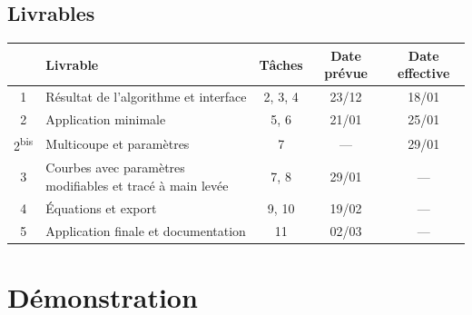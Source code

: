 \documentclass[xcolor=dvipsnames]{beamer}
\begin{document}
	\subsection{Livrables}
	\begin{frame}{\subsecname}
		\begin{center}
		\small
		\begin{tabular}{|c|>{\raggedright}m{3cm}|c|c|c|} %
			\hline
			\textbf{\No} & \textbf{Livrable} & \textbf{T\^aches}
			& \textbf{Date pr\'evue} & \textbf{Date effective}\\
			\hline
			1 & R\'esultat de l'algorithme et interface & 2, 3, 4 & 23/12 
			& 18/01\\
			\hline
			2 & Application minimale & 5, 6 & 21/01 & 25/01\\
			\hline
			2\textsuperscript{bis} & Multicoupe et param\`etres & 7 & --- & 29/01\\
			\hline
			3 & Courbes avec param\`etres modifiables et trac\'e \`a main
			lev\'ee& 7, 8 & 29/01 & ---\\
			\hline
			4 & \'Equations et export & 9, 10 & 19/02 & ---\\
			\hline
			5 & Application finale et documentation & 11 & 02/03 & ---\\
			\hline
		\end{tabular}
		\end{center}
	\end{frame}




\section{D\'emonstration}




\end{document}
